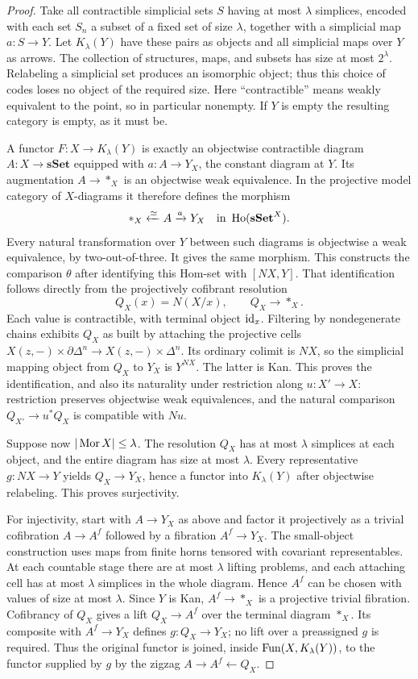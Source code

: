\begin{proof}
Take all contractible simplicial sets $S$ having at most $\lambda$ simplices, encoded with each set $S_n$ a subset of a fixed set of size $\lambda$, together with a simplicial map $a:S\to Y$. Let $K_\lambda(Y)$ have these pairs as objects and all simplicial maps over $Y$ as arrows. The collection of structures, maps, and subsets has size at most $2^\lambda$. Relabeling a simplicial set produces an isomorphic object; thus this choice of codes loses no object of the required size. Here ``contractible'' means weakly equivalent to the point, so in particular nonempty. If $Y$ is empty the resulting category is empty, as it must be.

A functor $F:X\to K_\lambda(Y)$ is exactly an objectwise contractible diagram $A:X\to\mathbf{sSet}$ equipped with $a:A\to Y_X$, the constant diagram at $Y$. Its augmentation $A\to *_X$ is an objectwise weak equivalence. In the projective model category of $X$-diagrams it therefore defines the morphism
\[
 *_X\xleftarrow{\simeq}A\xrightarrow{a}Y_X
 \quad\text{in }\operatorname{Ho}(\mathbf{sSet}^X).
\]
Every natural transformation over $Y$ between such diagrams is objectwise a weak equivalence, by two-out-of-three. It gives the same morphism. This constructs the comparison $\theta$ after identifying this Hom-set with $[NX,Y]$. That identification follows directly from the projectively cofibrant resolution
\[
 Q_X(x)=N(X/x),\qquad Q_X\longrightarrow *_X.
\]
Each value is contractible, with terminal object $\mathrm{id}_x$. Filtering by nondegenerate chains exhibits $Q_X$ as built by attaching the projective cells $X(z,-)\times\partial\Delta^n\to X(z,-)\times\Delta^n$. Its ordinary colimit is $NX$, so the simplicial mapping object from $Q_X$ to $Y_X$ is $Y^{NX}$. The latter is Kan. This proves the identification, and also its naturality under restriction along $u:X'\to X$: restriction preserves objectwise weak equivalences, and the natural comparison $Q_{X'}\to u^*Q_X$ is compatible with $Nu$.

Suppose now $|\operatorname{Mor} X|\leq\lambda$. The resolution $Q_X$ has at most $\lambda$ simplices at each object, and the entire diagram has size at most $\lambda$. Every representative $g:NX\to Y$ yields $Q_X\to Y_X$, hence a functor into $K_\lambda(Y)$ after objectwise relabeling. This proves surjectivity.

For injectivity, start with $A\to Y_X$ as above and factor it projectively as a trivial cofibration $A\to A^f$ followed by a fibration $A^f\to Y_X$. The small-object construction uses maps from finite horns tensored with covariant representables. At each countable stage there are at most $\lambda$ lifting problems, and each attaching cell has at most $\lambda$ simplices in the whole diagram. Hence $A^f$ can be chosen with values of size at most $\lambda$. Since $Y$ is Kan, $A^f\to *_X$ is a projective trivial fibration. Cofibrancy of $Q_X$ gives a lift $Q_X\to A^f$ over the terminal diagram $*_X$. Its composite with $A^f\to Y_X$ defines $g:Q_X\to Y_X$; no lift over a preassigned $g$ is required. Thus the original functor is joined, inside $\operatorname{Fun}(X,K_\lambda(Y))$, to the functor supplied by $g$ by the zigzag $A\to A^f\leftarrow Q_X$.


\end{proof}
